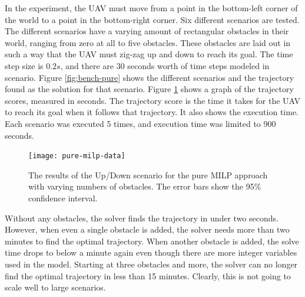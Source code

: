 In the experiment, the UAV must move from a point in the bottom-left corner of the world to a point in the bottom-right corner. Six different scenarios are tested. The different scenarios have a varying amount of rectangular obstacles in their world, ranging from zero at all to five obstacles. These obstacles are laid out in such a way that the UAV must zig-zag up and down to reach its goal. The time step size is $0.2s$, and there are 30 seconds worth of time steps modeled in scenario. Figure \ref{fig:bench-pure} shows the different scenarios and the trajectory found as the solution for that scenario. Figure \ref{fig:pure-data} shows a graph of the trajectory scores, measured in seconds. The trajectory score is the time it takes for the UAV to reach its goal when it follows that trajectory. It also shows the execution time. Each scenario was executed 5 times, and execution time was limited to 900 seconds.

\begin{figure}[t]
	\centering
	\texttt{[image: pure-milp-data]}
	\caption[The results for the pure MILP approach ]{The results of the Up/Down scenario for the pure MILP approach with varying numbers of obstacles. The error bars show the 95\% confidence interval.}
	\label{fig:pure-data}
\end{figure}

Without any obstacles, the solver finds the trajectory in under two seconds. However, when even a single obstacle is added, the solver needs more than two minutes to find the optimal trajectory. When another obstacle is added, the solve time drops to below a minute again even though there are more integer variables used in the model. Starting at three obstacles and more, the solver can no longer find the optimal trajectory in less than 15 minutes. Clearly, this is not going to scale well to large scenarios.
